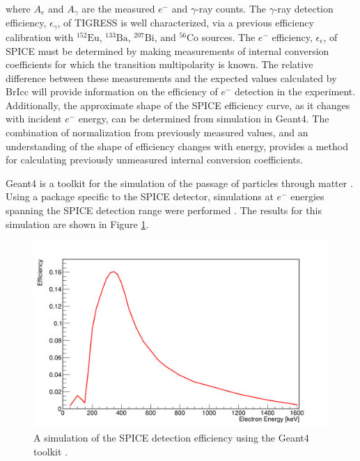 where $A_e$ and $A_\gamma$ are the measured $e^-$ and $\gamma$-ray counts. The $\gamma$-ray detection efficiency, $\epsilon_\gamma$, of TIGRESS is well characterized, via a previous efficiency calibration with $^{152}\mathrm{Eu}$, $^{133}\mathrm{Ba}$, $^{207}\mathrm{Bi}$, and $^{56}\mathrm{Co}$ sources. The $e^-$ efficiency, $\epsilon_e$, of SPICE must be determined by making measurements of internal conversion coefficients for which the transition multipolarity is known. The relative difference between these measurements and the expected values calculated by BrIcc will provide information on the efficiency of $e^-$ detection in the experiment. Additionally, the approximate shape of the SPICE efficiency curve, as it changes with incident $e^-$ energy, can be determined from simulation in Geant4. The combination of normalization from previously measured values, and an understanding of the shape of efficiency changes with energy, provides a method for calculating previously unmeasured internal conversion coefficients. 

Geant4 is a toolkit for the simulation of the passage of particles through matter \cite{Geant4}. Using a package specific to the SPICE detector, simulations at $e^-$ energies spanning the SPICE detection range were performed \cite{detectorSimulations}. The results for this simulation are shown in Figure \ref{figure: SPICE simulated efficiency}. 


\begin{figure}[!ht]
  \centering
  \includegraphics[width=\textwidth]{techniques_spice_simulation.png}
  \caption[A simulation of the SPICE detection efficiency using the Geant4 toolkit.]{A simulation of the SPICE detection efficiency using the Geant4 toolkit \cite{detectorSimulations,Geant4}.}
  \label{figure: SPICE simulated efficiency}
\end{figure}

